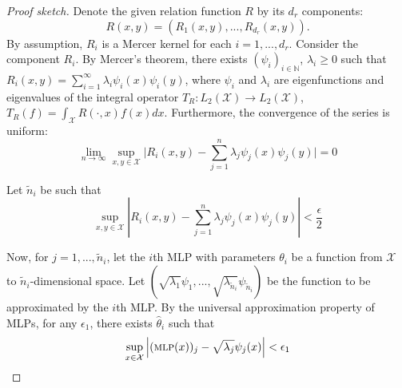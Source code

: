 \begin{proof}[Proof sketch]
	\hphantom{~}

	Denote the given relation function $R$ by its $d_r$ components: 
	\begin{equation}
		R(x,y) = (R_1(x,y), ..., R_{d_r}(x,y)). 
	\end{equation}
	By assumption, $R_i$ is a Mercer kernel for each $i = 1, ..., d_r$. Consider the component $R_i$. By Mercer's theorem, there exists $(\psi_i)_{i \in \mathbb{N}}$, $\lambda_i \geq 0$ such that $R_i(x,y) = \sum_{i=1}^{\infty}{\lambda_i \psi_i(x) \psi_i(y)}$, where $\psi_i$ and $\lambda_i$ are eigenfunctions and eigenvalues of the integral operator $T_R: L_2(\mathcal{X}) \to L_2(\mathcal{X})$, $T_R(f) = \int_{\mathcal{X}}{R(\cdot, x) f(x) dx}$. Furthermore, the convergence of the series is uniform:
	\begin{equation}
		\lim_{n \to \infty} \sup_{x,y \in \mathcal{X}} \lvert R_i(x,y) - \sum_{j=1}^{n}{\lambda_j \psi_j(x) \psi_j(y) \rvert} = 0
	\end{equation}

	Let $\tilde{n}_i$ be such that
	\begin{equation}
		\label{eq:proof_mercer_thm_unif_abs_cv}
		\sup_{x,y \in \mathcal{X}} \left\lvert R_i(x,y) - \sum_{j=1}^{n}{\lambda_j \psi_j(x) \psi_j(y)} \right\rvert < \frac{\epsilon}{2}
	\end{equation}

	Now, for $j = 1, ..., \tilde{n}_i$, let the $i$th MLP with parameters $\theta_i$ be a function from $\mathcal{X}$ to $\tilde{n}_i$-dimensional space. Let $(\sqrt{\lambda_1} \psi_1, ..., \sqrt{\lambda_{\tilde{n}_i}} \psi_{\tilde{n}_i})$ be the function to be approximated by the $i$th MLP. By the universal approximation property of MLPs, for any $\epsilon_1$, there exists $\hat{\theta}_i$ such that
	\begin{equation}
		\label{eq:proof_MLP_UAP}
		\sup_{x\in \mathcal{X}}{\left\lvert (\MLP(x))_j - \sqrt{\lambda_j} \psi_j(x) \right\lvert } < \epsilon_1
	\end{equation}


\end{proof}
